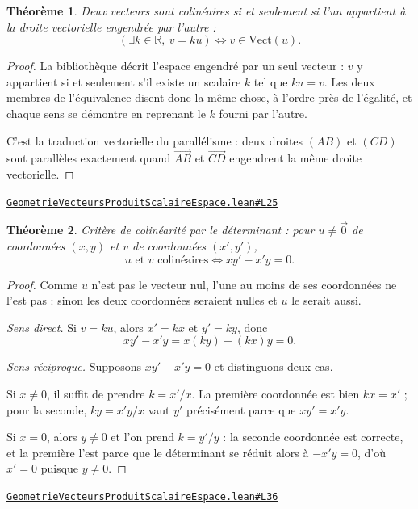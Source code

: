 \documentclass[11pt,a4paper]{article}
\theoremstyle{definition}
\theoremstyle{plain}
\newtheorem{theoreme}{Théorème}
\newcommand{\source}[2]{\par\smallskip\noindent\hfill{\footnotesize\href{#1}{\texttt{#2}}}\par\smallskip}
\begin{document}
\begin{theoreme}
Deux vecteurs sont colinéaires si et seulement si l'un appartient à la droite vectorielle
engendrée par l'autre :
\[ (\exists k \in \mathbb{R},\ v = k u) \iff v \in \mathrm{Vect}(u) . \]
\end{theoreme}

\begin{proof}
La bibliothèque décrit l'espace engendré par un seul vecteur : $v$ y appartient si et
seulement s'il existe un scalaire $k$ tel que $ku = v$. Les deux membres de l'équivalence
disent donc la même chose, à l'ordre près de l'égalité, et chaque sens se démontre en
reprenant le $k$ fourni par l'autre.

\medskip\noindent
C'est la traduction vectorielle du parallélisme : deux droites $(AB)$ et $(CD)$ sont
parallèles exactement quand $\overrightarrow{AB}$ et $\overrightarrow{CD}$ engendrent la
même droite vectorielle.
\end{proof}
\source{https://github.com/Commutator-IO/learn-lean/blob/main/cours/02-lycee/08-geometrie-vecteurs-produit-scalaire-espace/GeometrieVecteursProduitScalaireEspace.lean\#L25}{GeometrieVecteursProduitScalaireEspace.lean\#L25}

\begin{theoreme}
Critère de colinéarité par le déterminant : pour $u \ne \vec 0$ de coordonnées
$(x, y)$ et $v$ de coordonnées $(x', y')$,
\[ u \text{ et } v \text{ colinéaires} \iff xy' - x'y = 0 . \]
\end{theoreme}

\begin{proof}
Comme $u$ n'est pas le vecteur nul, l'une au moins de ses coordonnées ne l'est pas : sinon
les deux coordonnées seraient nulles et $u$ le serait aussi.

\smallskip\noindent
\emph{Sens direct.} Si $v = ku$, alors $x' = kx$ et $y' = ky$, donc
\[ xy' - x'y = x(ky) - (kx)y = 0 . \]

\smallskip\noindent
\emph{Sens réciproque.} Supposons $xy' - x'y = 0$ et distinguons deux cas.

Si $x \ne 0$, il suffit de prendre $k = x'/x$. La première coordonnée est bien
$k x = x'$ ; pour la seconde, $ky = x'y/x$ vaut $y'$ précisément parce que
$xy' = x'y$.

Si $x = 0$, alors $y \ne 0$ et l'on prend $k = y'/y$ : la seconde coordonnée est correcte,
et la première l'est parce que le déterminant se réduit alors à $-x'y = 0$, d'où $x' = 0$
puisque $y \ne 0$.
\end{proof}
\source{https://github.com/Commutator-IO/learn-lean/blob/main/cours/02-lycee/08-geometrie-vecteurs-produit-scalaire-espace/GeometrieVecteursProduitScalaireEspace.lean\#L36}{GeometrieVecteursProduitScalaireEspace.lean\#L36}
\end{document}
